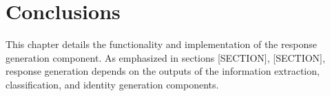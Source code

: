 \chapter{Conclusions}

This chapter details the functionality and implementation of the response generation component. As emphasized in sections [SECTION], [SECTION], response generation depends on the outputs of the information extraction, classification, and identity generation components. 

